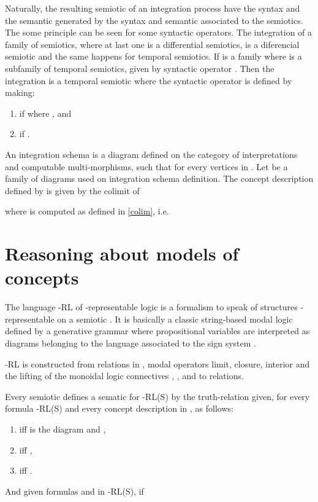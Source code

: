 \documentclass[oribibl]{llncs}
\begin{document}
Naturally, the resulting semiotic of an integration process have the syntax and the semantic generated by the syntax and semantic associated to the semiotics. The some principle can be seen for some syntactic operators. The integration of a family of semiotics, where at last one is a  differential semiotics, is a diferencial semiotic and the same happens for temporal semiotics. If  is a family where  is a subfamily of temporal semiotics, given by syntactic operator . Then the integration  is a temporal semiotic where the syntactic operator  is defined by making:
\begin{enumerate}
  \item  if  where , and
  \item  if .
\end{enumerate}

An integration schema is a diagram  defined on the category of interpretations and computable multi-morphisms, such that  for every vertices  in . Let  be a family of diagrams used on integration schema  definition. The concept description   defined by  is given by the colimit of 

where  is computed as defined in \ref{colim}, i.e.



\section{Reasoning about models of concepts}\label{reasoning}

The language -RL of -representable logic is a
formalism to speak of structures -representable on a
semiotic . It is basically a classic string-based modal logic
defined by a generative grammar where propositional variables are
interpreted as diagrams belonging to the language associated to the
sign system .

-RL is constructed from relations in , modal
operators limit, closure, interior and the lifting of the monoidal logic
connectives  , ,  and  to relations.

Every semiotic  defines a sematic for -RL(S) by the
truth-relation  given, for every formula
-RL(S) and every concept description  in
, as follows:
\begin{enumerate}
  \item  iff  is the diagram  and ,
 \item  iff ,
  \item  iff .
\end{enumerate}
And given formulas
 and  in -RL(S), if
\end{document}
